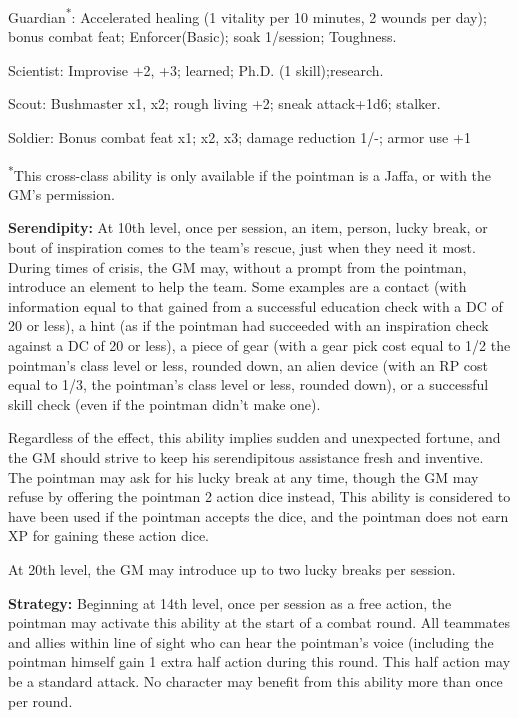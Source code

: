 \begin{description*}
\item[\hspace{1.5cm}Guardian\textsuperscript{*}:] Accelerated healing (1 vitality per 10 minutes, 2 wounds per day); bonus combat feat; Enforcer(Basic); soak 1/session; Toughness.
\item[\hspace{1.5cm}Scientist:] Improvise +2, +3; learned; Ph.D. (1 skill);research.
\item[\hspace{1.5cm}Scout:] Bushmaster x1, x2; rough living +2; sneak attack+1d6; stalker.
\item[\hspace{1.5cm}Soldier:] Bonus combat feat x1; x2, x3; damage reduction 1/-; armor use +1
\item[]\textsuperscript{*}This cross-class ability is only available if the pointman is a Jaffa, or with the GM's permission.
\end{description*}

\textbf{Serendipity:} At 10th level, once per session, an item, person, lucky break, or bout of inspiration comes to the team's rescue, just when they need it most. During times of crisis, the GM may, without a prompt from the pointman, introduce an element to help the team. Some examples are a contact (with information equal to that gained from a successful education check with a DC of 20 or less), a hint (as if the pointman had succeeded with an inspiration check against a DC of 20 or less), a piece of gear (with a gear pick cost equal to 1/2 the pointman's class level or less, rounded down, an alien device (with an RP cost equal to 1/3, the pointman's class level or less, rounded down), or a successful skill check (even if the pointman didn't make one).

Regardless of the effect, this ability implies sudden and unexpected fortune, and the GM should strive to keep his serendipitous assistance fresh and inventive. The pointman may ask for his lucky break at any time, though the GM may refuse by offering the pointman 2 action dice instead, This ability is considered to have been used if the pointman accepts the dice, and the pointman does not earn XP for gaining these action dice.

At 20th level, the GM may introduce up to two lucky breaks per session.

\textbf{Strategy:} Beginning at 14th level, once per session as a free action, the pointman may activate this ability at the start of a combat round. All teammates and allies within line of sight who can hear the pointman's voice (including the pointman himself gain 1 extra half action during this round. This half action may be a standard attack. No character may benefit from this ability more than once per round.



